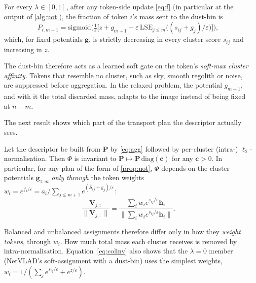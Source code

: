 \begin{proposition}\label{prop:dustbin}
For every $\lambda\in[0,1]$, after any token-side update \eqref{eq:f} (in particular at the
output of \cref{alg:uot}), the fraction of token $i$'s mass sent to the dust-bin is
\begin{equation}
P_{i,m+1}=\mathrm{sigmoid}\!\Big(\tfrac{1}{\varepsilon}\big[z+g_{m+1}-\varepsilon\,\mathrm{LSE}_{j\le m}\big((s_{ij}+g_j)/\varepsilon\big)\big]\Big),
\label{eq:gate}
\end{equation}
which, for fixed potentials $\mathbf{g}$, is strictly decreasing in every cluster score $s_{ij}$ and increasing in $z$.
\end{proposition}
The dust-bin therefore acts as a learned soft gate on the token's \emph{soft-max cluster affinity}.
Tokens that resemble no cluster, such as sky, smooth regolith or noise, are suppressed before
aggregation. In the relaxed problem, the potential $g_{m+1}$, and with it the total discarded
mass, adapts to the image instead of being fixed at $n-m$.

The next result shows which part of the transport plan the descriptor actually sees.

\begin{proposition}\label{prop:colinv}
Let the descriptor be built from $\mathbf{P}$ by \eqref{eq:agg} followed by per-cluster (intra-)
$\ell_2$-normalisation. Then $\Phi$ is invariant to $\mathbf{P}\mapsto\mathbf{P}\,\mathrm{diag}(\mathbf{c})$
for any $\mathbf{c}>0$. In particular, for any plan of the form of \cref{prop:uot}, $\Phi$ depends on the
cluster potentials $\mathbf{g}_{1:m}$ \emph{only through} the token weights
$w_i=e^{f_i/\varepsilon}=a_i\big/\sum_{j\le m+1}e^{(\bar S_{ij}+g_j)/\varepsilon}$:
\begin{equation}
\frac{\mathbf{V}_{j,:}}{\|\mathbf{V}_{j,:}\|}=\frac{\sum_i w_i e^{s_{ij}/\varepsilon}\mathbf{h}_i}{\big\|\sum_i w_i e^{s_{ij}/\varepsilon}\mathbf{h}_i\big\|}.
\label{eq:colinv}
\end{equation}
\end{proposition}
Balanced and unbalanced assignments therefore differ only in how they \emph{weight tokens}, through
$w_i$. How much total mass each cluster receives is removed by intra-normalisation. Equation~\eqref{eq:colinv}
also shows that the $\lambda=0$ member (NetVLAD's soft-assignment with a dust-bin) uses the simplest
weights, $w_i=1/(\sum_{j}e^{s_{ij}/\varepsilon}+e^{z/\varepsilon})$.

